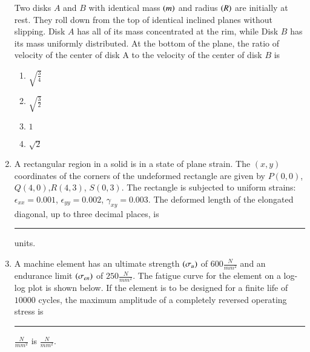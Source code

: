 \documentclass[journal]{IEEEtran}
\begin{document}
\begin{enumerate}
{Two disks $A$ and $B$ with identical mass $\left(m\right)$ and radius $\left(R\right)$ are initially at rest. They roll down from the top of identical inclined planes without slipping. Disk $A$ has all of its mass concentrated at the rim, while Disk $B$ has its mass uniformly distributed. At the bottom of the plane, the ratio of velocity of the center of disk A to the velocity of the center of disk $B$ is
\begin{multicols}{4}
\begin{enumerate}
\item $\sqrt{\frac{3}{4}}$
\item $\sqrt{\frac{3}{2}}$
\item $1$
\item $\sqrt{2}$
\end{enumerate}
\end{multicols}
}
\item{
A rectangular region in a solid is in a state of plane strain. The $(x,y)$ coordinates of the corners of the undeformed rectangle are given by $P(0,0)$,$Q(4,0)$,$R(4,3)$, $S(0,3)$. The rectangle is subjected to uniform strains:$\epsilon_{xx} = 0.001$, $\epsilon_{yy} = 0.002$, $\gamma_{xy} = 0.003$. The deformed length of the elongated diagonal, up to three decimal places, is \rule{2cm}{0.15mm} units.
}
\item{
A machine element has an ultimate strength $\left(\sigma_u\right)$ of $600\frac{N}{mm^2}$ and an endurance limit $\left(\sigma_{en}\right)$ of $250\frac{N}{mm^2}$. The fatigue curve for the element on a log-log plot is shown below. If the element is to be designed for a finite life of $10000$ cycles, the maximum amplitude of a completely reversed operating stress is \rule{2cm}{0.15mm} $\frac{N}{mm^2}$ 
 is $\frac{N}{mm^2}$.
 \begin{figure}[H]
\centering
{}%


\end{figure}}
\end{enumerate}
\end{document}
